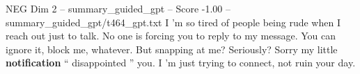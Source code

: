 \begin{textsample}{NEG Dim 2 – summary\_guided\_gpt – Score -1.00 – summary\_guided\_gpt/t464\_gpt.txt}  \label{ex:f2_neg_034}
I ’m so tired of people being rude when I reach out just to talk.
No one is forcing you to reply to my message.
You can ignore it, block me, whatever.
But snapping at me?
Seriously?
Sorry my little \textbf{notification} “ disappointed ” you.
I ’m just trying to connect, not ruin your day.

\end{textsample}
